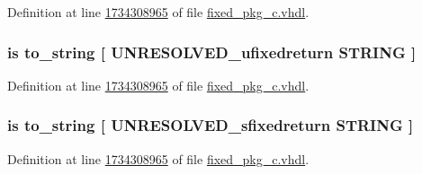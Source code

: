 Definition at line \hyperlink{fixed__pkg__c_8vhdl_source_l1734308965}{1734308965} of file \hyperlink{fixed__pkg__c_8vhdl_source}{fixed\+\_\+pkg\+\_\+c.\+vhdl}.

\hypertarget{classfixed__pkg_ae7de5f0a1ca9e038b33dac7c8680a1e2}{}
\subsubsection[{to\+\_\+bstring}]{ {\bfseries \textcolor{keywordflow}{is}\textcolor{vhdlchar}{ }\textcolor{vhdlchar}{to\+\_\+string}\textcolor{vhdlchar}{ }\textcolor{vhdlchar}{\mbox{[}}\textcolor{vhdlchar}{ }\textcolor{vhdlchar}{U\+N\+R\+E\+S\+O\+L\+V\+E\+D\+\_\+ufixedreturn}\textcolor{vhdlchar}{ }\textcolor{comment}{S\+T\+R\+I\+N\+G}\textcolor{vhdlchar}{ }\textcolor{vhdlchar}{\mbox{]}}\textcolor{vhdlchar}{ }} \hspace{0.3cm}{\ttfamily [Alias]}}\label{classfixed__pkg_ae7de5f0a1ca9e038b33dac7c8680a1e2}


Definition at line \hyperlink{fixed__pkg__c_8vhdl_source_l1734308965}{1734308965} of file \hyperlink{fixed__pkg__c_8vhdl_source}{fixed\+\_\+pkg\+\_\+c.\+vhdl}.

\hypertarget{classfixed__pkg_ab0df1e66ba14653bc1c17d30b9c54ab3}{}
\subsubsection[{to\+\_\+bstring}]{ {\bfseries \textcolor{keywordflow}{is}\textcolor{vhdlchar}{ }\textcolor{vhdlchar}{to\+\_\+string}\textcolor{vhdlchar}{ }\textcolor{vhdlchar}{\mbox{[}}\textcolor{vhdlchar}{ }\textcolor{vhdlchar}{U\+N\+R\+E\+S\+O\+L\+V\+E\+D\+\_\+sfixedreturn}\textcolor{vhdlchar}{ }\textcolor{comment}{S\+T\+R\+I\+N\+G}\textcolor{vhdlchar}{ }\textcolor{vhdlchar}{\mbox{]}}\textcolor{vhdlchar}{ }} \hspace{0.3cm}{\ttfamily [Alias]}}\label{classfixed__pkg_ab0df1e66ba14653bc1c17d30b9c54ab3}


Definition at line \hyperlink{fixed__pkg__c_8vhdl_source_l1734308965}{1734308965} of file \hyperlink{fixed__pkg__c_8vhdl_source}{fixed\+\_\+pkg\+\_\+c.\+vhdl}.

